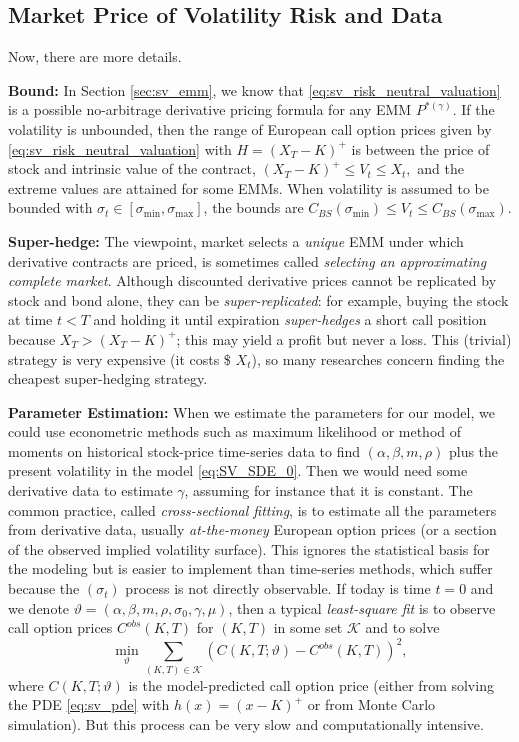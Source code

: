 \documentclass[a4paper,12pt]{article}
\numberwithin{equation}{section}
\theoremstyle{definition}
\theoremstyle{remark}
\begin{document}
\subsection{Market Price of Volatility Risk and Data}
Now, there are more details.

\textbf{Bound:} In Section \ref{sec:sv_emm}, we know that 
\eqref{eq:sv_risk_neutral_valuation} is a possible no-arbitrage 
derivative pricing formula for any EMM $P^{*(\gamma)}$. If the 
volatility is unbounded, then the range of European call option 
prices given by \eqref{eq:sv_risk_neutral_valuation} with 
$H=(X_{T}-K)^{+}$ is between the price of stock and intrinsic value 
of the contract, $(X_{T}-K)^{+}\leq V_{t}\leq X_{t},$ and the 
extreme values are attained for some EMMs. When volatility is assumed 
to be bounded with $\sigma_{t}\in[\sigma_{\mathrm{min}},\sigma_{\mathrm{max}}]$, 
the bounds are $C_{BS}(\sigma_{\mathrm{min}})\leq V_{t}\leq C_{BS}(\sigma_{\mathrm{max}})$. 

\textbf{Super-hedge:} The viewpoint, market selects a \textit{unique} EMM 
under which derivative contracts are priced, is sometimes called 
\textit{selecting an approximating complete market}. Although discounted 
derivative prices cannot be replicated by stock and bond alone, 
they can be \textit{super-replicated}: for example, buying the 
stock at time $t<T$ and holding it until expiration 
\textit{super-hedges} a short call position because 
$X_{T}>(X_{T}-K)^{+}$; this may yield a profit but never a loss. 
This (trivial) strategy is very expensive (it costs \$ $X_t$), so 
many researches concern finding the cheapest super-hedging strategy.

\textbf{Parameter Estimation:} When we estimate the parameters for 
our model, we could use econometric methods such as maximum 
likelihood or method of moments on historical stock-price 
time-series data to find $(\alpha,\beta,m,\rho)$ plus the present 
volatility in the model \eqref{eq:SV_SDE_0}. Then we would 
need some derivative data to estimate $\gamma$, assuming for 
instance that it is constant. The common practice, called 
\textit{cross-sectional fitting}, is to estimate all the 
parameters from derivative data, usually \textit{at-the-money} 
European option prices (or a section of the observed implied 
volatility surface). This ignores the statistical basis for the 
modeling but is easier to implement than time-series methods, 
which suffer because the $(\sigma_{t})$ process is not directly 
observable. If today is time $t=0$ and we denote 
$\vartheta=(\alpha,\beta,m,\rho,\sigma_{0},\gamma,\mu)$, 
then a typical \textit{least-square fit} is to observe call option 
prices $C^{obs}(K,T)$ for $(K,T)$ in some set $\mathcal{K}$ and to 
solve 
\begin{equation}
    \min_{\vartheta} \sum_{(K,T)\in\mathcal{K}} (C(K,T;\vartheta)
    -C^{obs}(K,T))^{2},
\end{equation}
where $C(K,T;\vartheta)$ is the model-predicted call option price 
(either from solving the PDE \eqref{eq:sv_pde} with 
$h(x)=(x-K)^{+}$ or from Monte Carlo simulation). But this process 
can be very slow and computationally intensive.
\end{document}
